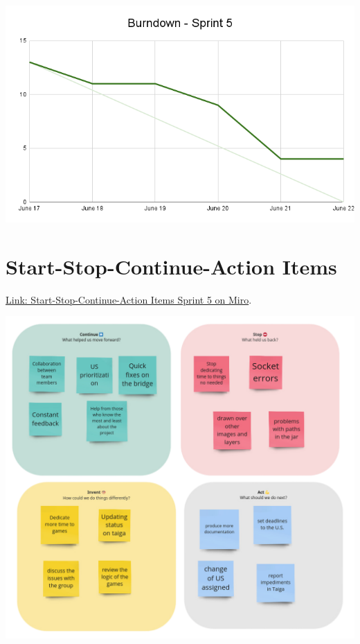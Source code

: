 \includegraphics[width=\textwidth]{./assets/Burndown-Sprint5.png}

\hypertarget{startstopcontinueactionitems-s3}{
\section{Start-Stop-Continue-Action Items}\label{Start-Stop-Continue-Action Items S6}}
\href{https://miro.com/app/board/uXjVKDO7l8M=/?moveToWidget=3458764590247999187&cot=14}{Link: Start-Stop-Continue-Action Items Sprint 5 on Miro}.

\includegraphics[width=\textwidth]{./assets/Retrospectives-Sprint5.png}


